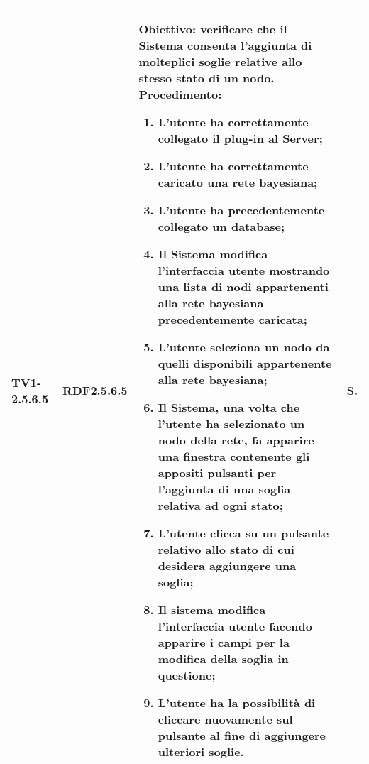 \begin{longtable}{|C{.15\textwidth}|C{.13\textwidth}|m{.65\textwidth}|C{.08\textwidth}|}
TV1-2.5.6.5 & RDF2.5.6.5  &
	\textbf{Obiettivo}: verificare che il Sistema consenta l'aggiunta di molteplici soglie relative allo stesso stato di un nodo. \newline
	\textbf{Procedimento}:
	\begin{enumerate}
		\item L'utente ha correttamente collegato il plug-in al Server;
		\item L'utente ha correttamente caricato una rete bayesiana;
		\item L'utente ha precedentemente collegato un database;
		\item Il Sistema modifica l'interfaccia utente mostrando una lista di nodi appartenenti alla rete bayesiana precedentemente caricata;
		\item L'utente seleziona un nodo da quelli disponibili appartenente alla rete bayesiana;
		\item Il Sistema, una volta che l'utente ha selezionato un nodo della rete, fa apparire una finestra contenente gli appositi pulsanti per l'aggiunta di una soglia relativa ad ogni stato;
		\item L'utente clicca su un pulsante relativo allo stato di cui desidera aggiungere una soglia;
		\item Il sistema modifica l'interfaccia utente facendo apparire i campi per la modifica della soglia in questione;
		\item L'utente ha la possibilità di cliccare nuovamente sul pulsante al fine di aggiungere ulteriori soglie.
	\end{enumerate}
	& S. \\
\hline


\end{longtable}
